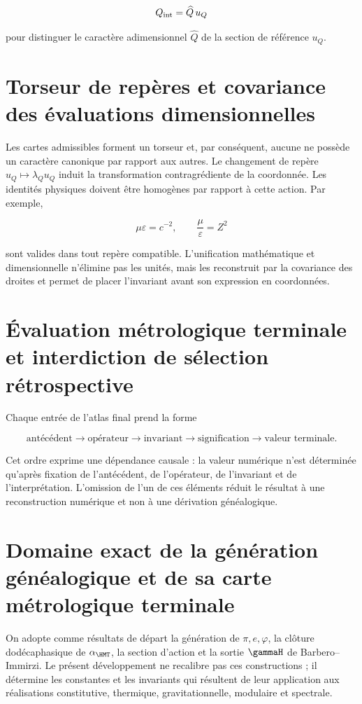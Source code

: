 \[
Q_{\rm int}=\widehat Q\,u_Q
\]

pour distinguer le caractère adimensionnel \(\widehat Q\) de la section
de référence \(u_Q\).

\section{Torseur de repères et covariance des évaluations dimensionnelles}

Les cartes admissibles forment un torseur et, par conséquent, aucune ne possède un caractère
canonique par rapport aux autres. Le changement de repère
\(u_Q\mapsto\lambda_Q u_Q\) induit la transformation contragrédiente
de la coordonnée. Les identités physiques doivent être homogènes par rapport
à cette action. Par exemple,

\[
\mu\varepsilon=c^{-2},\qquad \frac\mu\varepsilon=Z^2
\]

sont valides dans tout repère compatible. L’unification mathématique et
dimensionnelle n’élimine pas les unités, mais les reconstruit par la
covariance des droites et permet de placer l’invariant avant son expression
en coordonnées.

\section{Évaluation métrologique terminale et interdiction de sélection rétrospective}

Chaque entrée de l’atlas final prend la forme

\begin{equation}
\boxed{\text{antécédent}\to\text{opérateur}\to\text{invariant}
\to\text{signification}\to\text{valeur terminale}.}
\label{p3-83-c23-s1:eq:atlas-rule}
\end{equation}

Cet ordre exprime une dépendance causale : la valeur numérique n’est
déterminée qu’après fixation de l’antécédent, de l’opérateur, de l’invariant et de
l’interprétation. L’omission de l’un de ces éléments réduit le
résultat à une reconstruction numérique et non à une dérivation
généalogique.

\section{Domaine exact de la génération généalogique et de sa carte métrologique terminale}

On adopte comme résultats de départ la génération de
\(\pi,e,\varphi\), la clôture dodécaphasique de \(\alpha_{\HMT}\),
la section d’action et la sortie \(\gammaH\) de Barbero--Immirzi. Le
présent développement ne recalibre pas ces constructions ; il détermine les constantes
et les invariants qui résultent de leur application aux réalisations
constitutive, thermique, gravitationnelle, modulaire et spectrale.

